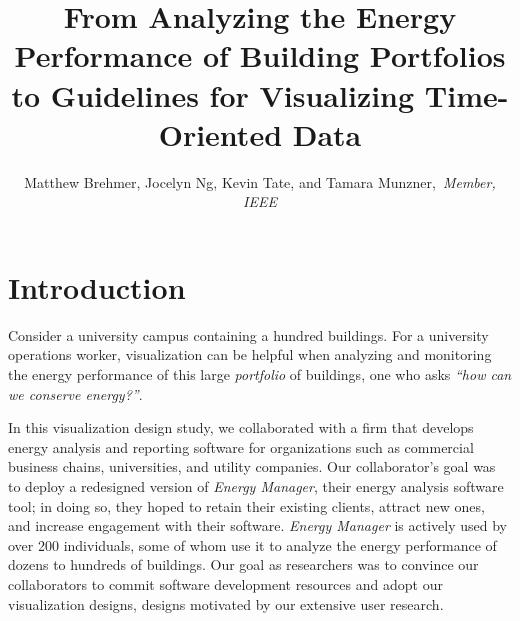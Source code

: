 \documentclass[journal]{vgtc}                %
\title{From Analyzing the Energy Performance of Building Portfolios to Guidelines for Visualizing Time-Oriented Data}
\author{Matthew Brehmer, Jocelyn Ng, Kevin Tate, and Tamara Munzner,~\textit{Member, IEEE}}
\begin{document}

\maketitle



\section{Introduction}
\label{introduction}


Consider a university campus containing a hundred buildings. 
For a university operations worker, visualization can be helpful when analyzing and monitoring the energy performance of this large {\it portfolio} of buildings, one who asks {\it ``how can we conserve energy?''}. 

In this visualization design study, we collaborated with a firm that develops energy analysis and reporting software for organizations such as commercial business chains, universities, and utility companies.
Our collaborator's goal was to deploy a redesigned version of {\it Energy Manager}, their energy analysis software tool; in doing so, they hoped to retain their existing clients, attract new ones, and increase engagement with their software. 
{\it Energy Manager} is actively used by over 200 individuals, some of whom use it to analyze the energy performance of dozens to hundreds of buildings.
Our goal as researchers was to convince our collaborators to commit software development resources and adopt our visualization designs, designs motivated by our extensive user research.
\end{document}
